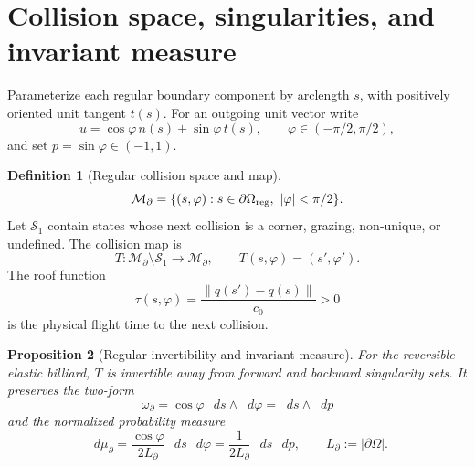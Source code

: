 \documentclass[11pt,a4paper]{article}
\theoremstyle{definition}
\newtheorem{definition}{Definition}[section]
\theoremstyle{plain}
\newtheorem{proposition}[definition]{Proposition}
\theoremstyle{remark}
\newcommand{\dd}{\mathop{}\!d}
\newcommand{\norm}[1]{\left\lVert #1\right\rVert}
\newcommand{\Scal}{\mathcal S}
\newcommand{\Mcal}{\mathcal M}
\begin{document}
\begin{center}
\end{center}

\section{Collision space, singularities, and invariant measure}

Parameterize each regular boundary component by arclength \(s\), with
positively oriented unit tangent \(t(s)\). For an outgoing unit vector
write
\[
u=\cos\varphi\,n(s)+\sin\varphi\,t(s),\qquad
\varphi\in(-\pi/2,\pi/2),
\]
and set \(p=\sin\varphi\in(-1,1)\).

\begin{definition}[Regular collision space and map]
\[
\Mcal_\partial
=\{(s,\varphi):s\in\partial\Omega_{\rm reg},
\ |\varphi|<\pi/2\}.
\]
Let \(\Scal_1\) contain states whose next collision is a corner,
grazing, non-unique, or undefined. The collision map is
\[
T:\Mcal_\partial\setminus\Scal_1\longrightarrow\Mcal_\partial,
\qquad T(s,\varphi)=(s',\varphi').
\]
The roof function
\[
\tau(s,\varphi)
=\frac{\norm{q(s')-q(s)}}{c_0}>0
\]
is the physical flight time to the next collision.
\end{definition}

\begin{proposition}[Regular invertibility and invariant measure]
\label{prop:collision-measure}
For the reversible elastic billiard, \(T\) is invertible away from
forward and backward singularity sets. It preserves the two-form
\[
\omega_\partial=\cos\varphi\,\dd s\wedge\dd\varphi
=\dd s\wedge\dd p
\]
and the normalized probability measure
\begin{equation}\label{eq:collision-measure}
\dd\mu_\partial
=\frac{\cos\varphi}{2L_\partial}\,\dd s\,\dd\varphi
=\frac{1}{2L_\partial}\,\dd s\,\dd p,
\qquad L_\partial:=|\partial\Omega|.
\end{equation}
\end{proposition}
\end{document}
